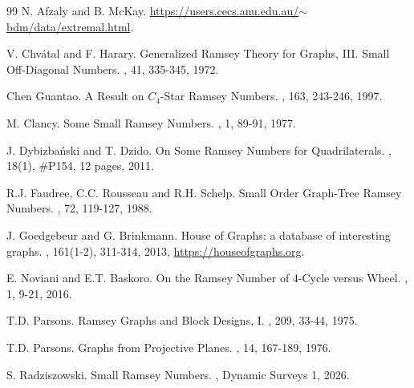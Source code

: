 \documentclass[12]{article}
\begin{document}
\begin{thebibliography}{99}
\newblock N. Afzaly and B. McKay.
\newblock \href{https://users.cecs.anu.edu.au/~bdm/data/extremal.html}{https://users.cecs.anu.edu.au/$\textstyle\sim$bdm/data/extremal.html}.

\newblock V. Chv\'atal and F. Harary.
\newblock Generalized Ramsey Theory for Graphs, III. Small Off-Diagonal Numbers.
, 41, 335-345, 1972.

\newblock Chen Guantao.
\newblock A Result on $C_4$-Star Ramsey Numbers.
, 163, 243-246, 1997.

\newblock M. Clancy.
\newblock  Some Small Ramsey Numbers.
, 1, 89-91, 1977.

\newblock J. Dybizba\'nski and T. Dzido.
\newblock On Some Ramsey Numbers for Quadrilaterals.
, 18(1), \#P154, 12 pages, 2011.

\newblock R.J. Faudree, C.C. Rousseau and R.H. Schelp.
\newblock Small Order Graph-Tree Ramsey Numbers.
, 72, 119-127, 1988.


\newblock J. Goedgebeur and G. Brinkmann.
\newblock House of Graphs: a database of interesting graphs.
, 161(1-2), 311-314, 2013, \url{https://houseofgraphs.org}.

\newblock E. Noviani and E.T. Baskoro.
\newblock On the Ramsey Number of 4-Cycle versus Wheel.
, 1, 9-21, 2016.

\newblock T.D. Parsons.
\newblock Ramsey Graphs and Block Designs, I.
, 209, 33-44, 1975.

\newblock T.D. Parsons.
\newblock Graphs from Projective Planes.
, 14, 167-189, 1976.

\newblock S. Radziszowski.
\newblock Small Ramsey Numbers.
, Dynamic Surveys 1, 2026.


\end{thebibliography}
\end{document}
